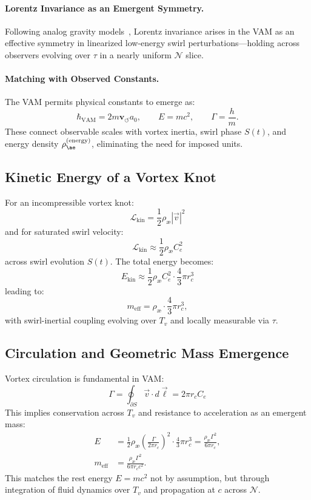 \documentclass[12pt]{article}
\begin{document}
\paragraph{Lorentz Invariance as an Emergent Symmetry.}
Following analog gravity models~\cite{barcelo2011}, Lorentz invariance arises in the VAM as an effective symmetry in linearized low-energy swirl perturbations—holding across observers evolving over $\tau$ in a nearly uniform $\mathcal{N}$ slice.

\paragraph{Matching with Observed Constants.}
The VAM permits physical constants to emerge as:
\[
    \hbar_{\text{VAM}} = 2 m \mathbf{v}_{\scriptscriptstyle\boldsymbol{\circlearrowleft}} a_0, \qquad E = m c^2, \qquad \Gamma = \frac{h}{m}.
\]
These connect observable scales with vortex inertia, swirl phase $S(t)$, and energy density $\rho_{\ae}^{(\text{energy})}$, eliminating the need for imposed units.

\subsection{Kinetic Energy of a Vortex Knot}

For an incompressible vortex knot:
\begin{equation}
    \mathcal{L}_\text{kin} = \frac{1}{2} \rho_\text{\ae} |\vec{v}|^2
\end{equation}
and for saturated swirl velocity:
\[
    \mathcal{L}_\text{kin} \approx \frac{1}{2} \rho_\text{\ae} C_e^2
\]
across swirl evolution $S(t)$. The total energy becomes:
\[
    E_\text{kin} \approx \frac{1}{2} \rho_\text{\ae} C_e^2 \cdot \frac{4}{3} \pi r_c^3
\]
leading to:
\[
    m_\text{eff} = \rho_\text{\ae} \cdot \frac{4}{3} \pi r_c^3,
\]
with swirl-inertial coupling evolving over $T_v$ and locally measurable via $\tau$.

\subsection{Circulation and Geometric Mass Emergence}

Vortex circulation is fundamental in VAM:
\[
    \Gamma = \oint_{\partial S} \vec{v} \cdot d\vec{\ell} = 2\pi r_c C_e
\]
This implies conservation across $T_v$ and resistance to acceleration as an emergent mass:
\begin{align}
    E &= \frac{1}{2} \rho_\text{\ae} \left( \frac{\Gamma}{2\pi r_c} \right)^2 \cdot \frac{4}{3} \pi r_c^3
    = \frac{\rho_\text{\ae} \Gamma^2}{6\pi r_c}, \\
    m_\text{eff} &= \frac{\rho_\text{\ae} \Gamma^2}{6\pi r_c c^2}.
\end{align}
This matches the rest energy \( E = m c^2 \) not by assumption, but through integration of fluid dynamics over $T_v$ and propagation at $c$ across $\mathcal{N}$.
\end{document}
